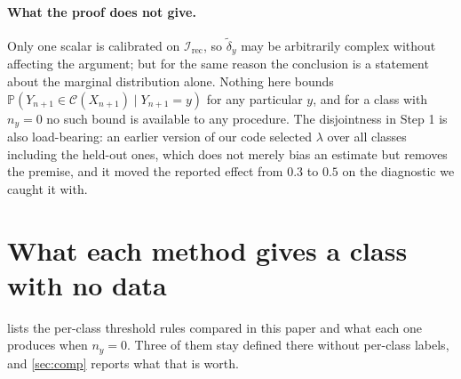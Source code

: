 \paragraph{What the proof does not give.} Only one scalar is calibrated on
$\mathcal{I}_{\mathrm{rec}}$, so $\tilde\delta_y$ may be arbitrarily complex without affecting
the argument; but for the same reason the conclusion is a statement about the marginal
distribution alone. Nothing here bounds
$\mathbb{P}(Y_{n+1}\in\mathcal{C}(X_{n+1})\mid Y_{n+1}=y)$ for any particular $y$, and for a
class with $n_y=0$ no such bound is available to any procedure. The disjointness in Step 1 is
also load-bearing: an earlier version of our code selected $\lambda$ over all classes including
the held-out ones, which does not merely bias an estimate but removes the premise, and it moved
the reported effect from $0.3$ to $0.5$ on the diagnostic we caught it with.

\section{What each method gives a class with no data}
\label{app:methods}

 lists the per-class threshold rules compared in this paper and what each
one produces when $n_y=0$. Three of them stay defined there without per-class labels, and
\cref{sec:comp} reports what that is worth.


